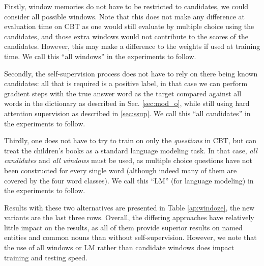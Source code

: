Firstly, window memories do not have to be restricted to candidates, we could consider all possible windows.
Note that this does not make any difference at evaluation time on CBT as one would still evaluate by multiple choice using the candidates, and those extra windows would not contribute to the scores of the candidates.
However, this may make a difference to the weights if used at training time.
We call this ``all windows'' in the experiments to follow.

Secondly, the self-supervision process does not have to rely on there being known candidates:
all that is required is a positive label, in that case we can perform gradient steps with
the true answer word as the target compared against all words in the dictionary as described in Sec. \ref{sec:mod_o}, 
while still using hard attention supervision as described in \ref{sec:ssup}. 
We call this ``all candidates'' in the experiments to follow.

Thirdly, one does not have to try to train on only the {\em questions} in CBT, but can treat the children's 
books as a standard 
language modeling task. In that case, {\em all candidates} and {\em all windows} must be used, as multiple choice questions have not been constructed for every single word (although indeed many of them are covered by the four word classes). We call
this ``LM'' (for language modeling) in the experiments to follow.

Results with these two alternatives are presented in Table \ref{ap:windoze}, the new variants are the last three rows.
Overall, the differing approaches have relatively little impact on the results, as all of them provide superior
results on named entities and common nouns than without self-supervision.
However, we note that 
the use of all windows or LM rather than candidate windows does impact training and testing speed.


